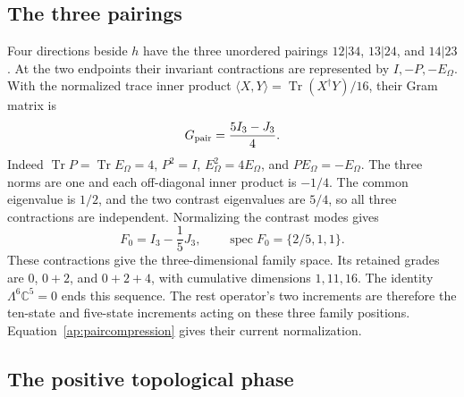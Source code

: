 \documentclass[aps,prx,reprint,longbibliography]{revtex4-2}
\providecommand{\Tr}{\operatorname{Tr}}
\providecommand{\spec}{\operatorname{spec}}
\providecommand{\C}{\mathbb C}
\begin{document}
\subsection{The three pairings}
\label{app:families}

Four directions beside $h$ have the three unordered pairings $12|34$, $13|24$, and $14|23$. At the two endpoints their invariant contractions are represented by $I,-P,-E_\Omega$. With the normalized trace inner product $\langle X,Y\rangle=\Tr(X^\dagger Y)/16$, their Gram matrix is
\begin{equation}
 G_{\rm pair}=\frac{5I_3-J_3}{4}.
 \label{ap:pair-gram}
\end{equation}
Indeed $\Tr P=\Tr E_\Omega=4$, $P^2=I$, $E_\Omega^2=4E_\Omega$, and $PE_\Omega=-E_\Omega$. The three norms are one and each off-diagonal inner product is $-1/4$. The common eigenvalue is $1/2$, and the two contrast eigenvalues are $5/4$, so all three contractions are independent. Normalizing the contrast modes gives
\begin{equation}
 F_0=I_3-\frac15J_3,\qquad\spec F_0=\{2/5,1,1\}.
 \label{ap:pair-normalized}
\end{equation}
These contractions give the three-dimensional family space. Its retained grades are $0$, $0+2$, and $0+2+4$, with cumulative dimensions $1,11,16$. The identity $\Lambda^6\C^5=0$ ends this sequence. The rest operator's two increments are therefore the ten-state and five-state increments acting on these three family positions. Equation~\eqref{ap:paircompression} gives their current normalization.

\subsection{The positive topological phase}
\label{app:theta}
\end{document}
